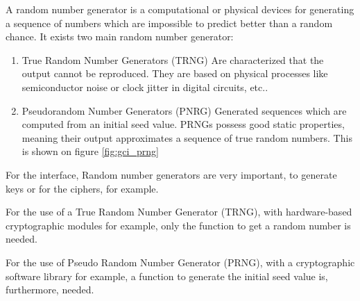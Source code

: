 A random number generator is a computational or physical devices for generating
a sequence of numbers which are impossible to predict better than a random
chance.\newline
It exists two main random number generator:
\begin{enumerate}
  \item True Random Number Generators (TRNG)\newline
  Are characterized that the output cannot be reproduced. They are based on
  physical processes like semiconductor noise or clock jitter in digital
  circuits, etc..
  \item Pseudorandom Number Generators (PNRG)
  Generated sequences which are computed from an initial seed value. PRNGs
  possess good static properties, meaning their output approximates a sequence
  of true random numbers. This is shown on figure \ref{fig:gci_prng}
\end{enumerate}

For the interface, Random number generators are very important, to generate keys
or for the ciphers, for example.

For the use of a True Random Number Generator (TRNG), with hardware-based
cryptographic modules for example, only the function to get a random number is
needed.

For the use of Pseudo Random Number Generator (PRNG), with a
cryptographic software library for example, a function to generate the initial
seed value is, furthermore, needed.



